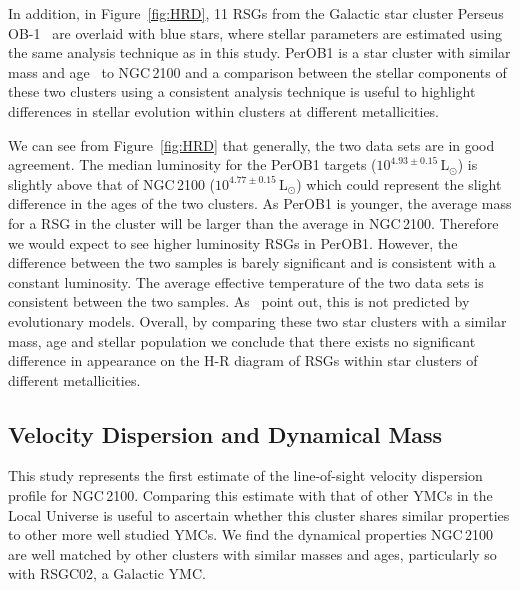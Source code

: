\documentclass[useAMS,usenatbib]{mn2e}
\def\kms{$\mbox{km s}^{-1}$}
\begin{document}
In addition, in Figure~\ref{fig:HRD}, 11 RSGs from the Galactic star cluster Perseus OB-1~\citep[PerOB1;][]{2014ApJ...787..142G} are overlaid with blue stars, where stellar parameters are estimated using the same analysis technique as in this study.
PerOB1 is a star cluster with similar mass and age~\citep[$2\times10^{4}\,$M$_{\odot}$ and 14\,Myr respectively;][]{2010ApJS..186..191C} to NGC\,2100 and a comparison between the stellar components of these two clusters using a consistent analysis technique is useful to highlight differences in stellar evolution within clusters at different metallicities.

We can see from Figure~\ref{fig:HRD} that generally, the two data sets are in good agreement.
The median luminosity for the PerOB1 targets ($10^{4.93\pm0.15}\,$L$_{\odot}$) is slightly above that of NGC\,2100 ($10^{4.77\pm0.15}\,$L$_{\odot}$) which could represent the slight difference in the ages of the two clusters.
As PerOB1 is younger, the average mass for a RSG in the cluster will be larger than the average in NGC\,2100.
Therefore we would expect to see higher luminosity RSGs in PerOB1.
However, the difference between the two samples is barely significant and is consistent with a constant luminosity.
The average effective temperature of the two data sets is consistent between the two samples.
As~\cite{2015ApJ...803...14P} point out, this is not predicted by evolutionary models.
Overall, by comparing these two star clusters with a similar mass, age and stellar population we conclude that there exists no significant difference in appearance on the H-R diagram of RSGs within star clusters of different metallicities.







\subsection{Velocity Dispersion and Dynamical Mass} %
\label{sub:velocity_dispersion_Mdyn}

This study represents the first estimate of the line-of-sight velocity dispersion profile for NGC\,2100.
Comparing this estimate with that of other YMCs in the Local Universe is useful to ascertain whether this cluster shares similar properties to other more well studied YMCs.
We find the dynamical properties NGC\,2100 are well matched by other clusters with similar masses and ages, particularly so with RSGC02, a Galactic YMC.
\end{document}
